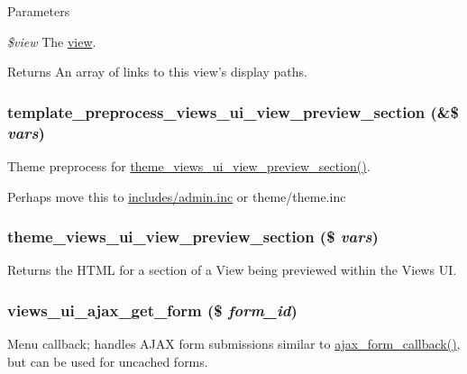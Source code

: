 \begin{DoxyParams}{Parameters}
\item[{\em \$view}]The \hyperlink{classview}{view}.\end{DoxyParams}
\begin{DoxyReturn}{Returns}
An array of links to this view's display paths. 
\end{DoxyReturn}
\hypertarget{views__ui_8module_aa7dae7204d3172c008b70fb345f5738c}{
\subsubsection[{template\_\-preprocess\_\-views\_\-ui\_\-view\_\-preview\_\-section}]{\setlength{\rightskip}{0pt plus 5cm}template\_\-preprocess\_\-views\_\-ui\_\-view\_\-preview\_\-section (\&\$ {\em vars})}}
\label{views__ui_8module_aa7dae7204d3172c008b70fb345f5738c}
Theme preprocess for \hyperlink{views__ui_8module_a9c4eea67a43b66c32761d5ac40f32b70}{theme\_\-views\_\-ui\_\-view\_\-preview\_\-section()}.

Perhaps move this to \hyperlink{admin_8inc}{includes/admin.inc} or theme/theme.inc \hypertarget{views__ui_8module_a9c4eea67a43b66c32761d5ac40f32b70}{
\subsubsection[{theme\_\-views\_\-ui\_\-view\_\-preview\_\-section}]{\setlength{\rightskip}{0pt plus 5cm}theme\_\-views\_\-ui\_\-view\_\-preview\_\-section (\$ {\em vars})}}
\label{views__ui_8module_a9c4eea67a43b66c32761d5ac40f32b70}
Returns the HTML for a section of a View being previewed within the Views UI. \hypertarget{views__ui_8module_a869b55ec9965e41d8498ff9269b652b7}{
\subsubsection[{views\_\-ui\_\-ajax\_\-get\_\-form}]{\setlength{\rightskip}{0pt plus 5cm}views\_\-ui\_\-ajax\_\-get\_\-form (\$ {\em form\_\-id})}}
\label{views__ui_8module_a869b55ec9965e41d8498ff9269b652b7}
Menu callback; handles AJAX form submissions similar to \hyperlink{group__ajax_gabe2739824006df057d291f6be49759ab}{ajax\_\-form\_\-callback()}, but can be used for uncached forms.

